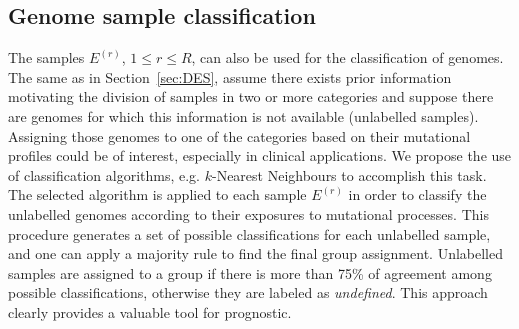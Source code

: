 \documentclass{bioinfo}
\begin{document}
\subsection{Genome sample classification}\label{sec:Class} 
The samples $E^{(r)}$, $1\leq r\leq R$, can also be used for the
classification of genomes. The same as in Section~\ref{sec:DES},
assume there exists prior information motivating the
division of samples in two or more categories and suppose there are
genomes for which this information is not available 
(unlabelled samples). Assigning those genomes to one of the categories 
based on their mutational profiles could be of interest, especially
in clinical applications. We propose the use of classification
algorithms, e.g. $k$-Nearest Neighbours to accomplish this task. The
selected algorithm is applied to each sample $E^{(r)}$ in order to
classify the unlabelled genomes according to their exposures to
mutational processes.  This procedure generates a set of possible
classifications for each unlabelled sample, and one can apply a
majority rule to find the final group assignment.  Unlabelled samples
are assigned to a group if there is more than 75\% of agreement among
possible classifications, otherwise they are labeled as
\textit{undefined}. This approach clearly provides a valuable tool
for prognostic.
\end{document}
